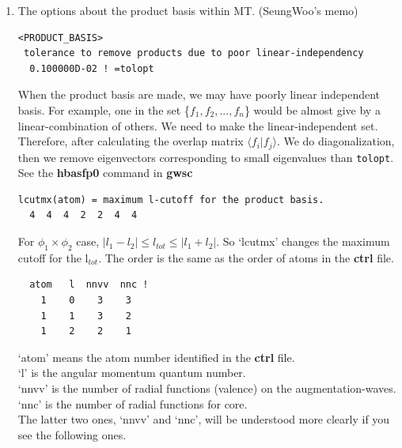 \documentclass[a4paper,10pt,epsf,fleqn]{article}
\begin{document}
{\begin{enumerate}
\item { The options about the product basis within MT. (SeungWoo's memo)}

\begin{verbatim}
<PRODUCT_BASIS>
 tolerance to remove products due to poor linear-independency
  0.100000D-02 ! =tolopt
\end{verbatim}
When the product basis are made, we may have poorly linear independent
basis. For example, one in the set \{$f_1, f_2, ..., f_n$\} would 
be almost give by a linear-combination of others. We need to make the
      linear-independent set. Therefore, after calculating the overlap matrix 
      $\langle  f_i|f_j \rangle$. We do diagonalization, then 
      we remove eigenvectors corresponding to small eigenvalues than
      \verb+tolopt+. 
      See the {\bf hbasfp0} command in {\bf gwsc}

\begin{verbatim}
lcutmx(atom) = maximum l-cutoff for the product basis.
  4  4  4  2  2  4  4
\end{verbatim}
For $\phi_1 \times \phi_2$ case, $|l_1 - l_2| \le l_{tot} \le |l_1 + l_2|$. So `lcutmx' changes the maximum cutoff for the l$_{tot}$. The order is the same as the order of atoms in the {\bf ctrl} file.

\begin{verbatim}
  atom   l  nnvv  nnc !
    1    0    3    3
    1    1    3    2
    1    2    2    1
\end{verbatim}
`atom' means the atom number identified in the {\bf ctrl} file.\\ 
`l' is the angular momentum quantum number.\\
`nnvv' is the number of radial functions (valence) on the augmentation-waves.\\
`nnc' is the number of radial functions for core.\\
The latter two ones, `nnvv' and `nnc', will be understood more clearly if you see the following ones.



\end{enumerate}}
\end{document}
